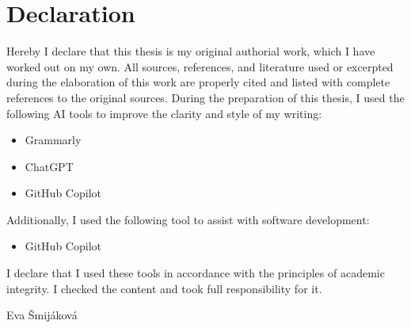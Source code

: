 

\begingroup

\let\clearpage\relax
\let\cleardoublepage\relax
\let\cleardoublepage\relax

\chapter*{Declaration}

Hereby I declare that this thesis is my original authorial work, which I have worked out on my own. All sources, references, and literature used or excerpted during the elaboration of this work are properly cited and listed with complete references to the original sources.
During the preparation of this thesis, I used the following AI tools
to improve the clarity and style of my writing:
\begin{itemize}
    \item Grammarly
    \item ChatGPT
    \item GitHub Copilot
\end{itemize}
Additionally, I used the following tool to assist with software development:
\begin{itemize}
    \item GitHub Copilot
\end{itemize}
I declare that I used these tools in accordance with the principles of
academic integrity. I checked the content and took full responsibility
for it.


\vspace*{1cm}

\hspace*{0pt}\hfill Eva Šmijáková


\endgroup

